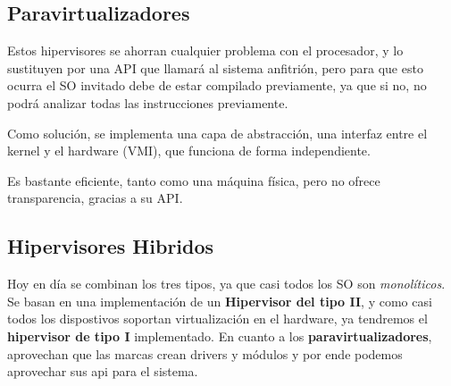 \subsection{Paravirtualizadores}
Estos hipervisores se ahorran cualquier problema con el procesador, y lo sustituyen por una API que llamará al sistema anfitrión, pero para que esto ocurra el SO invitado debe de estar compilado previamente, ya que si no, no podrá analizar todas las instrucciones previamente.
\par Como solución, se implementa una capa de abstracción, una interfaz entre el kernel y el hardware (VMI), que funciona de forma independiente.
\par Es bastante eficiente, tanto como una máquina física, pero no ofrece transparencia, gracias a su API.
\subsection{Hipervisores Hibridos}
Hoy en día se combinan los tres tipos, ya que casi todos los SO son \textit{monolíticos}. Se basan en una implementación de un \textbf{Hipervisor del tipo II}, y como casi todos los dispostivos soportan virtualización en el hardware, ya tendremos el \textbf{hipervisor de tipo I} implementado. En cuanto a los \textbf{paravirtualizadores}, aprovechan que las marcas crean drivers y módulos y por ende podemos aprovechar sus api para el sistema.